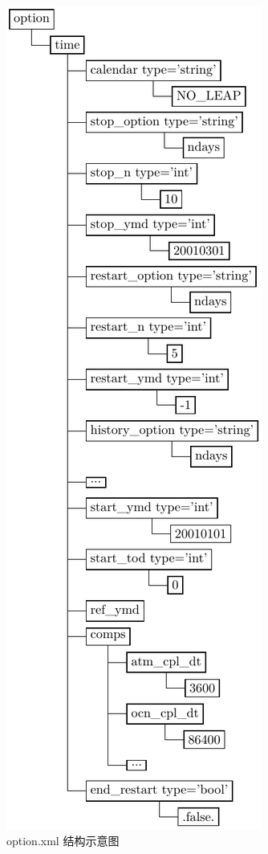 \begin{figure}[H]
\begin{minipage}[t]{0.5\linewidth}
\includegraphics[height=.5\textheight]{../figures/option.pdf}
\caption{option.xml 结构示意图}
\end{minipage}
\end{figure}

